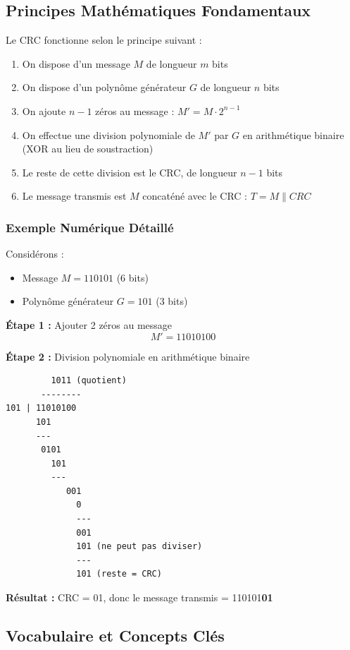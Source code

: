 \documentclass[12pt, a4paper]{article}
\begin{document}
\subsection{Principes Mathématiques Fondamentaux}

Le CRC fonctionne selon le principe suivant :

\begin{enumerate}
    \item On dispose d'un message $M$ de longueur $m$ bits
    \item On dispose d'un polynôme générateur $G$ de longueur $n$ bits
    \item On ajoute $n-1$ zéros au message : $M' = M \cdot 2^{n-1}$
    \item On effectue une division polynomiale de $M'$ par $G$ en arithmétique binaire (XOR au lieu de soustraction)
    \item Le reste de cette division est le CRC, de longueur $n-1$ bits
    \item Le message transmis est $M$ concaténé avec le CRC : $T = M \| CRC$
\end{enumerate}

\subsubsection{Exemple Numérique Détaillé}

Considérons :
\begin{itemize}
    \item Message $M = 110101$ (6 bits)
    \item Polynôme générateur $G = 101$ (3 bits)
\end{itemize}

\textbf{Étape 1 :} Ajouter 2 zéros au message
$$M' = 11010100$$

\textbf{Étape 2 :} Division polynomiale en arithmétique binaire
\begin{verbatim}
         1011 (quotient)
       --------
101 | 11010100
      101
      ---
       0101
         101
         ---
            001
              0
              ---
              001
              101 (ne peut pas diviser)
              ---
              101 (reste = CRC)
\end{verbatim}

\textbf{Résultat :} CRC = 01, donc le message transmis = 110101\textbf{01}

\subsection{Vocabulaire et Concepts Clés}
\end{document}
